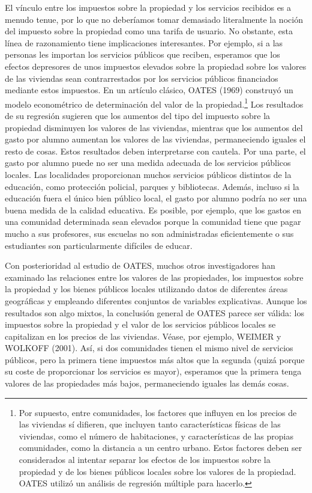 \documentclass[10pt,a4paper]{article}
\begin{document}
El vínculo entre los impuestos sobre la propiedad y los servicios recibidos es a menudo tenue, por lo que no deberíamos tomar demasiado literalmente la noción del impuesto sobre la propiedad como una tarifa de usuario. No obstante, esta línea de razonamiento tiene implicaciones interesantes. Por ejemplo, si a las personas les importan los servicios públicos que reciben, esperamos que los efectos depresores de unos impuestos elevados sobre la propiedad sobre los valores de las viviendas sean contrarrestados por los servicios públicos financiados mediante estos impuestos. En un artículo clásico, OATES (1969) construyó un modelo econométrico de determinación del valor de la propiedad.\footnote{%
    Por supuesto, entre comunidades, los factores que influyen en los precios de las viviendas sí difieren, que incluyen tanto características físicas de las viviendas, como el número de habitaciones, y características de las propias comunidades, como la distancia a un centro urbano. Estos factores deben ser considerados al intentar separar los efectos de los impuestos sobre la propiedad y de los bienes públicos locales sobre los valores de la propiedad. OATES utilizó un análisis de regresión múltiple para hacerlo.
} Los resultados de su regresión sugieren que los aumentos del tipo del impuesto sobre la propiedad disminuyen los valores de las viviendas, mientras que los aumentos del gasto por alumno aumentan los valores de las viviendas, permaneciendo iguales el resto de cosas.  Estos resultados deben interpretarse con cautela. Por una parte, el gasto por alumno puede no ser una medida adecuada de los servicios públicos locales. Las localidades proporcionan muchos servicios públicos distintos de la educación, como protección policial, parques y bibliotecas. Además, incluso si la educación fuera el único bien público local, el gasto por alumno podría no ser una buena medida de la calidad educativa. Es posible, por ejemplo, que los gastos en una comunidad determinada sean elevados porque la comunidad tiene que pagar mucho a sus profesores, sus escuelas no son administradas eficientemente o sus estudiantes son particularmente difíciles de educar.

Con posterioridad al estudio de OATES, muchos otros investigadores han examinado las relaciones entre los valores de las propiedades, los impuestos sobre la propiedad y los bienes públicos locales utilizando datos de diferentes áreas geográficas y empleando diferentes conjuntos de variables explicativas. Aunque los resultados son algo mixtos, la conclusión general de OATES parece ser válida: los impuestos sobre la propiedad y el valor de los servicios públicos locales se capitalizan en los precios de las viviendas. Véase, por ejemplo, WEIMER y WOLKOFF (2001). Así, si dos comunidades tienen el mismo nivel de servicios públicos, pero la primera tiene impuestos más altos que la segunda (quizá porque su coste de proporcionar los servicios es mayor), esperamos que la primera tenga valores de las propiedades más bajos, permaneciendo iguales las demás cosas. 
\end{document}
